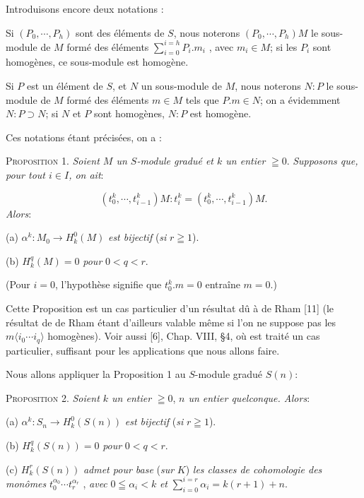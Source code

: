 Introduisons encore deux notations :

Si $(P_0 , \cdots , P_h)$ sont des éléments de $S$, nous noterons $(P_0 , \cdots , P_h)M$ le sous-module de $M$ formé des éléments $\sum_{i=0}^{i=h} P_i.m_i$ , avec $m_i \in M$; si les $P_i$ sont homogènes, ce sous-module est homogène.

Si $P$ est un élément de $S$, et $N$ un sous-module de $M$, nous noterons $N:P$ le sous-module de $M$ formé des éléments $m \in M$ tels que $P.m \in N$; on a évidemment $N:P \supset N$; si $N$ et $P$ sont homogènes, $N:P$ est homogène.

Ces notations étant précisées, on a :



\textsc{Proposition 1.} \textit{Soient $M$ un $S$-module gradué et $k$ un entier} $\geqq 0$. \textit{Supposons que, pour tout $i \in I$, on ait}:

\begin{equation*}
(t_0^k , \cdots , t_{i-1}^k)M : t_i^k = (t_0^k , \cdots , t_{i-1}^k)M.
\end{equation*}
\textit{Alors}:

(a) $\alpha^k : M_0 \to H_k^0(M)$ \textit{est bijectif} (\textit{si} $r \geqq 1$).

(b) $H_k^q(M) = 0$ \textit{pour} $0 < q < r$.

(Pour $i = 0$, l'hypothèse signifie que $t_0^k.m = 0$ entraîne $m = 0$.)

Cette Proposition est un cas particulier d'un résultat dû à de Rham [11] (le résultat de de Rham étant d'ailleurs valable même si l'on ne suppose pas les $m\langle i_0 \cdots i_q \rangle$ homogènes). Voir aussi [6], Chap. VIII, §4, où est traité un cas particulier, suffisant pour les applications que nous allons faire.

Nous allons appliquer la Proposition 1 au $S$-module gradué $S(n)$:

\textsc{Proposition 2.} \textit{Soient $k$ un entier} $\geqq 0$, \textit{$n$ un entier quelconque. Alors}:

(a) $\alpha^k : S_n \to H_k^0(S(n))$ \textit{est bijectif} (\textit{si} $r \geqq 1$).

(b) $H_k^q(S(n)) = 0$ \quad \textit{pour} $0 < q < r$.

(c) $H_k^r(S(n))$ \textit{admet pour base} (\textit{sur} $K$) \textit{les classes de cohomologie des monômes} $t_0^{\alpha_0} \cdots t_r^{\alpha_r}$ , \textit{avec} $0 \leqq \alpha_i < k$ \textit{et} $\sum_{i=0}^{i=r} \alpha_i = k(r + 1) + n$.

